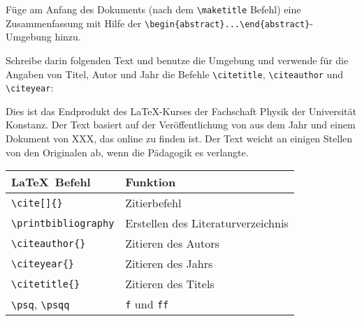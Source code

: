 \begin{frame}[fragile]
	\vspace{-0.3cm}
	\begin{Aufgabe}
		Füge am Anfang des Dokuments (nach dem \lstinline[basicstyle=\normalfont\normalsize]|\maketitle| Befehl) eine Zusammenfassung mit Hilfe der \lstinline[basicstyle=\normalfont\normalsize]|\begin{abstract}...\end{abstract}|-Umgebung hinzu.
		
		Schreibe darin folgenden Text und benutze die  Umgebung und verwende für die Angaben von Titel, Autor und Jahr die Befehle \lstinline[basicstyle=\normalfont\normalsize]|\citetitle|, \lstinline[basicstyle=\normalfont\normalsize]|\citeauthor| und \lstinline[basicstyle=\normalfont\normalsize]|\citeyear|:
	\end{Aufgabe}
	\begin{outputbox}
		Dies ist das Endprodukt des \LaTeX-Kurses der Fachschaft Physik der Universität Konstanz. Der Text basiert auf der Veröffentlichung  von \citeauthor{Petard1938} aus dem Jahr \citeyear{Petard1938} \cite[29\psqq]{Weber2013} und einem Dokument von XXX, das online zu finden ist. Der Text weicht an einigen Stellen von den Originalen ab, wenn die Pädagogik es verlangte.
	\end{outputbox}
	\btVFill\Befehle
	\begin{center}
		\begin{tabular}{ll}
			\toprule
			\LaTeX\ Befehl							&	Funktion					\\ \midrule
			\lstinline|\cite[]{}|					&	Zitierbefehl\\
			\lstinline|\printbibliography|			&	Erstellen des Literaturverzeichnis\\
			\lstinline|\citeauthor{}|				&	Zitieren des Autors \\
			\lstinline|\citeyear{}|					&	Zitieren des Jahrs \\
			\lstinline|\citetitle{}|				&	Zitieren des Titels \\
			\lstinline|\psq|, \lstinline|\psqq|		&	\texttt{f} und \texttt{ff} \\
			\bottomrule
		\end{tabular}
	\end{center}
	\vspace{0.1cm}
\end{frame}

